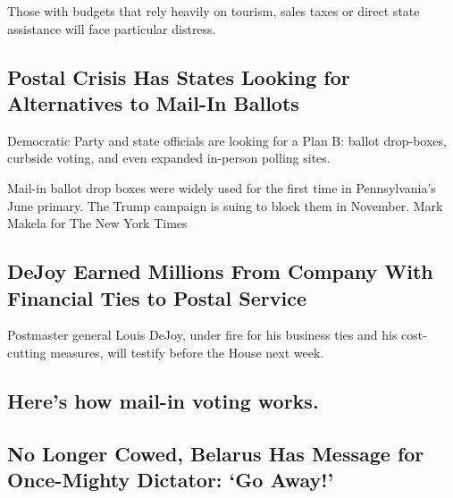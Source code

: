 Those with budgets that rely heavily on tourism, sales taxes or direct
state assistance will face particular distress.

\href{/2020/08/17/us/politics/postal-service-voting.html}{}

\hypertarget{postal-crisis-has-states-looking-for-alternatives-to-mail-in-ballots}{%
\subsection{Postal Crisis Has States Looking for Alternatives to Mail-In
Ballots}\label{postal-crisis-has-states-looking-for-alternatives-to-mail-in-ballots}}

Democratic Party and state officials are looking for a Plan B: ballot
drop-boxes, curbside voting, and even expanded in-person polling sites.

\href{/2020/08/17/us/politics/postal-service-voting.html}{}

Mail-in ballot drop boxes were widely used for the first time in
Pennsylvania's June primary. The Trump campaign is suing to block them
in November. Mark Makela for The New York Times

\href{/2020/08/17/us/politics/dejoy-postal-service-mail-in-voting.html}{}

\hypertarget{dejoy-earned-millions-from-company-with-financial-ties-to-postal-service}{%
\subsection{DeJoy Earned Millions From Company With Financial Ties to
Postal
Service}\label{dejoy-earned-millions-from-company-with-financial-ties-to-postal-service}}

Postmaster general Louis DeJoy, under fire for his business ties and his
cost-cutting measures, will testify before the House next week.

\href{/article/Vote-by-mail.html}{}

\hypertarget{heres-how-mail-in-voting-works}{%
\subsection{Here's how mail-in voting
works.}\label{heres-how-mail-in-voting-works}}

\href{/2020/08/17/world/europe/belarus-lukashenko-protests.html}{}

\hypertarget{no-longer-cowed-belarus-has-message-for-once-mighty-dictator-go-away}{%
\subsection{No Longer Cowed, Belarus Has Message for Once-Mighty
Dictator: `Go
Away!'}\label{no-longer-cowed-belarus-has-message-for-once-mighty-dictator-go-away}}

